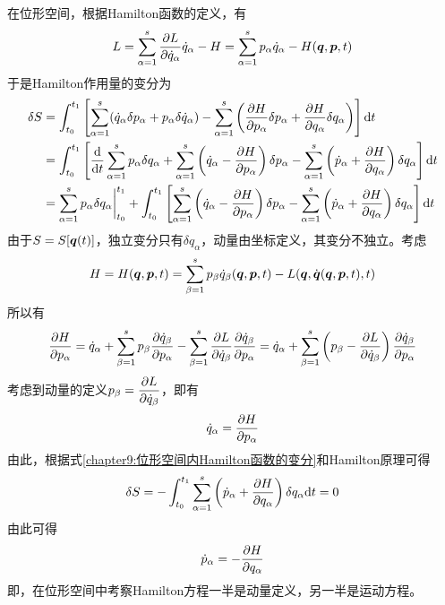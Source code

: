 在位形空间，根据Hamilton函数的定义，有
\begin{equation}
	L = \sum_{\alpha=1}^s \frac{\partial L}{\partial \dot{q}_\alpha} \dot{q}_\alpha - H = \sum_{\alpha=1}^s p_\alpha \dot{q}_\alpha - H(\boldsymbol{q},\boldsymbol{p},t)
\end{equation}
于是Hamilton作用量的变分为
\begin{align}
	\delta S & = \int_{t_0}^{t_1} \left[\sum_{\alpha=1}^s (\dot{q}_\alpha \delta p_\alpha + p_\alpha \delta \dot{q}_\alpha) - \sum_{\alpha=1}^s \left(\frac{\partial H}{\partial p_\alpha} \delta p_\alpha + \frac{\partial H}{\partial q_\alpha} \delta q_\alpha\right)\right] \mathrm{d} t \nonumber \\
	& = \int_{t_0}^{t_1} \left[\frac{\mathrm{d}}{\mathrm{d} t} \sum_{\alpha=1}^s p_\alpha \delta q_\alpha + \sum_{\alpha=1}^s \left(\dot{q}_\alpha - \frac{\partial H}{\partial p_\alpha}\right) \delta p_\alpha - \sum_{\alpha=1}^s \left(\dot{p}_\alpha + \frac{\partial H}{\partial q_\alpha} \right) \delta q_\alpha \right] \mathrm{d} t \nonumber \\
	& = \sum_{\alpha=1}^s p_\alpha \delta q_\alpha\bigg|_{t_0}^{t_1} + \int_{t_0}^{t_1} \left[\sum_{\alpha=1}^s \left(\dot{q}_\alpha - \frac{\partial H}{\partial p_\alpha}\right) \delta p_\alpha - \sum_{\alpha=1}^s \left(\dot{p}_\alpha + \frac{\partial H}{\partial q_\alpha}\right) \delta q_\alpha\right] \mathrm{d} t
	\label{chapter9:位形空间内Hamilton函数的变分}
\end{align}
由于$S = S[\boldsymbol{q}(t)]$，独立变分只有$\delta q_\alpha$，动量由坐标定义，其变分不独立。考虑
\begin{equation}
	H = H(\boldsymbol{q},\boldsymbol{p},t) = \sum_{\beta=1}^s p_\beta \dot{q}_\beta(\boldsymbol{q},\boldsymbol{p},t) - L(\boldsymbol{q},\dot{\boldsymbol{q}}(\boldsymbol{q},\boldsymbol{p},t),t)
\end{equation}
所以有
\begin{equation}
	\frac{\partial H}{\partial p_\alpha} = \dot{q}_\alpha + \sum_{\beta=1}^s p_\beta \frac{\partial \dot{q}_\beta}{\partial p_\alpha} - \sum_{\beta=1}^s \frac{\partial L}{\partial \dot{q}_\beta} \frac{\partial \dot{q}_\beta}{\partial p_\alpha} = \dot{q}_\alpha + \sum_{\beta=1}^s \left(p_\beta - \frac{\partial L}{\partial \dot{q}_\beta} \right) \frac{\partial \dot{q}_\beta}{\partial p_\alpha}
\end{equation}
考虑到动量的定义$p_\beta = \dfrac{\partial L}{\partial \dot{q}_\beta}$，即有
\begin{equation}
	\dot{q}_\alpha = \frac{\partial H}{\partial p_\alpha}
\end{equation}
由此，根据式\eqref{chapter9:位形空间内Hamilton函数的变分}和Hamilton原理可得
\begin{equation}
	\delta S = -\int_{t_0}^{t_1} \sum_{\alpha=1}^s \left(\dot{p}_\alpha + \frac{\partial H}{\partial q_\alpha} \right) \delta q_\alpha \mathrm{d} t = 0
\end{equation}
由此可得
\begin{equation}
	\dot{p}_\alpha = - \frac{\partial H}{\partial q_\alpha}
\end{equation}
即，在位形空间中考察Hamilton方程一半是动量定义，另一半是运动方程。

